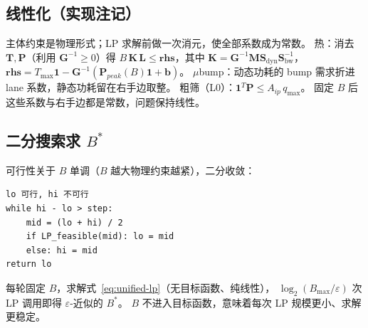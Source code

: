 \subsection{线性化（实现注记）}\label{sec:ov-linearize}

主体约束是物理形式；LP 求解前做一次消元，使全部系数成为常数。
热：消去 $\mathbf{T},\mathbf{P}$（利用 $\mathbf{G}^{-1}\ge 0$）得
$B\,\mathbf{K}\,\mathbf{L}\le\mathbf{rhs}$，其中 $\mathbf{K}=\mathbf{G}^{-1}\mathbf{M}\mathbf{S}_{\text{dyn}}\mathbf{S}_{\text{bw}}^{-1}$，
$\mathbf{rhs}=T_{\max}\mathbf{1}-\mathbf{G}^{-1}(\mathbf{P}_{peak}(B)\mathbf{1}+\mathbf{b})$。
$\mu$bump：动态功耗的 bump 需求折进 lane 系数，静态功耗留在右手边取整。
粗筛（L0）：$\mathbf{1}^T\mathbf{P}\le A_{ip}\,q_{\max}$。
固定 $B$ 后这些系数与右手边都是常数，问题保持线性。

\subsection{二分搜索求 $B^*$}\label{sec:ov-bisection}

可行性关于 $B$ 单调（$B$ 越大物理约束越紧），二分收敛：

\begin{verbatim}
lo 可行, hi 不可行
while hi - lo > step:
    mid = (lo + hi) / 2
    if LP_feasible(mid): lo = mid
    else: hi = mid
return lo
\end{verbatim}

每轮固定 $B$，求解式~\eqref{eq:unified-lp}（无目标函数、纯线性），
$\log_2(B_{\max}/\varepsilon)$ 次 LP 调用即得 $\varepsilon$-近似的 $B^*$。
$B$ 不进入目标函数，意味着每次 LP 规模更小、求解更稳定。
